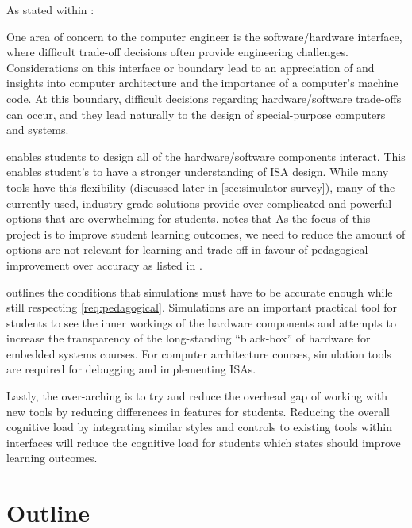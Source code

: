 As stated within \cite[p.~32]{cec2016}:
\begin{displayquote}
    One area of concern to the computer engineer is the software/hardware interface, where difficult trade-off    decisions often provide engineering challenges. Considerations on this interface or boundary lead to an    appreciation of and insights into computer architecture and the importance of a computer’s machine code. At this boundary, difficult decisions regarding hardware/software trade-offs can occur, and they lead naturally to the design of special-purpose computers and systems.
\end{displayquote}
 enables students to design all of the hardware/software components interact. This enables student's to have a stronger understanding of ISA design. While many tools have this flexibility (discussed later in \cref{sec:simulator-survey}), many of the currently used, industry-grade solutions provide over-complicated and powerful options that are overwhelming for students. \cite{Chalmers2003} notes that  As the focus of this project is to improve student learning outcomes, we need to reduce the amount of options are not relevant for learning and trade-off in favour of pedagogical improvement over accuracy as listed in . 

 outlines the conditions that simulations must have to be accurate enough while still respecting \cref{req:pedagogical}. Simulations are an important practical tool for students to see the inner workings of the hardware components and attempts to increase the transparency of the long-standing ``black-box'' of hardware for embedded systems courses. For computer architecture courses, simulation tools are required for debugging and implementing ISAs. 

Lastly, the over-arching  is to try and reduce the overhead gap of working with new tools by reducing differences in features for students. Reducing the overall cognitive load by integrating similar styles and controls to existing tools within interfaces will reduce the cognitive load for students which \cite{Chalmers2003} states should improve learning outcomes.


\section{Outline} 

